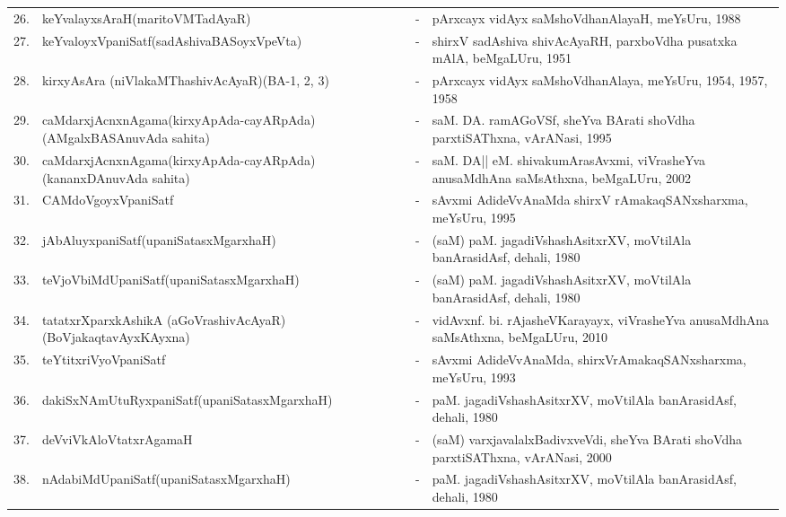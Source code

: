 {\begin{longtable}{rp{6cm}cp{9cm}<{\raggedright}}
26. & keYvalayxsAraH\newline (maritoVMTadAyaR) &-& pArxcayx vidAyx saMshoVdhanAlayaH, meYsUru, 1988\\
27. & keYvaloyxVpaniSatf\newline (sadAshivaBASoyxVpeVta) &-& shirxV sadAshiva shivAcAyaRH, parxboVdha pusatxka mAlA, beMgaLUru, 1951\\
28. & kirxyAsAra (niVlakaMThashivAcAyaR)\newline (BA-1, 2, 3) &-& pArxcayx vidAyx saMshoVdhanAlaya, meYsUru, 1954, 1957, 1958\\
29. & caMdarxjAcnxnAgama\newline (kirxyApAda-cayARpAda)\newline (AMgalxBASAnuvAda sahita) &-& saM. DA. ramAGoVSf, sheYva BArati shoVdha parxtiSAThxna, vArANasi, 1995\\
30. & caMdarxjAcnxnAgama\newline (kirxyApAda-cayARpAda)\newline (kananxDAnuvAda sahita) &-& saM. DA|| eM. shivakumArasAvxmi, viVrasheYva anusaMdhAna saMsAthxna, beMgaLUru, 2002\\
31. & CAMdoVgoyxVpaniSatf &-& sAvxmi AdideVvAnaMda shirxV rAmakaqSANxsharxma, meYsUru, 1995\\
32. & jAbAluyxpaniSatf\newline (upaniSatasxMgarxhaH) &-& (saM) paM. jagadiVshashAsitxrXV, moVtilAla banArasidAsf, dehali, 1980\\
33. & teVjoVbiMdUpaniSatf\newline (upaniSatasxMgarxhaH) &-& (saM) paM. jagadiVshashAsitxrXV, moVtilAla banArasidAsf, dehali, 1980\\
34. & tatatxrXparxkAshikA (aGoVrashivAcAyaR)\newline (BoVjakaqtavAyxKAyxna) &-& vidAvxnf. bi. rAjasheVKarayayx, viVrasheYva anusaMdhAna saMsAthxna, beMgaLUru, 2010\\
35. & teYtitxriVyoVpaniSatf &-& sAvxmi AdideVvAnaMda, shirxVrAmakaqSANxsharxma, meYsUru, 1993\\
36. & dakiSxNAmUtuRyxpaniSatf\newline (upaniSatasxMgarxhaH) &-& paM. jagadiVshashAsitxrXV, moVtilAla banArasidAsf, dehali, 1980\\
37. & deVviVkAloVtatxrAgamaH &-& (saM) varxjavalalxBadivxveVdi, sheYva BArati shoVdha parxtiSAThxna, vArANasi, 2000\\
38. & nAdabiMdUpaniSatf\newline (upaniSatasxMgarxhaH) &-& paM. jagadiVshashAsitxrXV, moVtilAla banArasidAsf, dehali, 1980\\

\end{longtable}}
